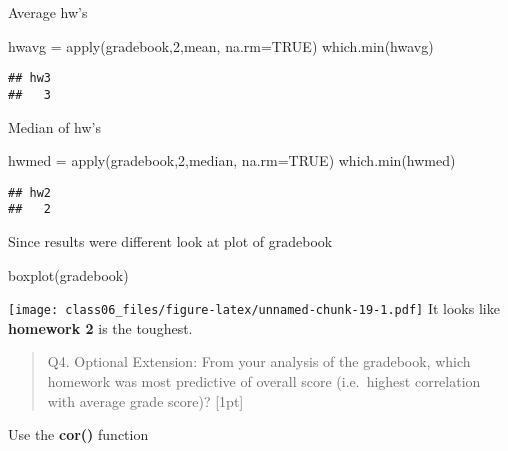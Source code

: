 \documentclass[
]{article}
\newenvironment{Shaded}{\begin{snugshade}}{\end{snugshade}}
\newcommand{\AttributeTok}[1]{\textcolor[rgb]{0.77,0.63,0.00}{#1}}
\newcommand{\ConstantTok}[1]{\textcolor[rgb]{0.00,0.00,0.00}{#1}}
\newcommand{\DecValTok}[1]{\textcolor[rgb]{0.00,0.00,0.81}{#1}}
\newcommand{\FunctionTok}[1]{\textcolor[rgb]{0.00,0.00,0.00}{#1}}
\newcommand{\NormalTok}[1]{#1}
\newcommand{\OtherTok}[1]{\textcolor[rgb]{0.56,0.35,0.01}{#1}}
\newcommand{\SpecialCharTok}[1]{\textcolor[rgb]{0.00,0.00,0.00}{#1}}
\begin{document}
Average hw's

\begin{Shaded}
\begin{Highlighting}[]
\NormalTok{hwavg }\OtherTok{=} \FunctionTok{apply}\NormalTok{(gradebook,}\DecValTok{2}\NormalTok{,mean, }\AttributeTok{na.rm=}\ConstantTok{TRUE}\NormalTok{)}
\FunctionTok{which.min}\NormalTok{(hwavg)}
\end{Highlighting}
\end{Shaded}

\begin{verbatim}
## hw3 
##   3
\end{verbatim}

Median of hw's

\begin{Shaded}
\begin{Highlighting}[]
\NormalTok{hwmed }\OtherTok{=} \FunctionTok{apply}\NormalTok{(gradebook,}\DecValTok{2}\NormalTok{,median, }\AttributeTok{na.rm=}\ConstantTok{TRUE}\NormalTok{)}
\FunctionTok{which.min}\NormalTok{(hwmed)}
\end{Highlighting}
\end{Shaded}

\begin{verbatim}
## hw2 
##   2
\end{verbatim}

Since results were different look at plot of gradebook

\begin{Shaded}
\begin{Highlighting}[]
\FunctionTok{boxplot}\NormalTok{(gradebook)}
\end{Highlighting}
\end{Shaded}

\texttt{[image: class06\_files/figure-latex/unnamed-chunk-19-1.pdf]} It
looks like \textbf{homework 2} is the toughest.

\begin{quote}
Q4. Optional Extension: From your analysis of the gradebook, which
homework was most predictive of overall score (i.e.~highest correlation
with average grade score)? {[}1pt{]}
\end{quote}

Use the \textbf{cor()} function

\begin{Shaded}
\end{Shaded}
\end{document}
